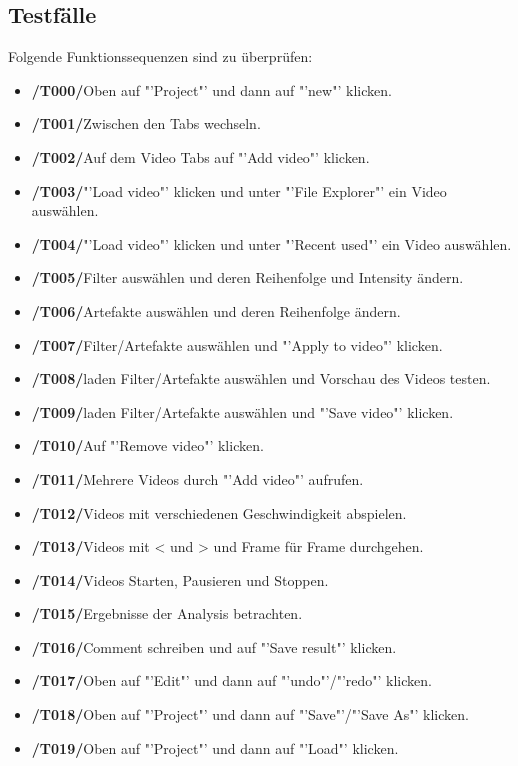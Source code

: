 \documentclass[parskip=full]{scrartcl}
\begin{document}
\subsection{Testfälle}
Folgende Funktionssequenzen sind zu überprüfen:
\begin{itemize}
\item[]\textbf{/T000/}\qquad Oben auf "'Project"' und dann auf "'new"' klicken.
\item[]\textbf{/T001/}\qquad Zwischen den Tabs wechseln.
\item[]\textbf{/T002/}\qquad Auf dem Video Tabs auf "'Add video"' klicken.
\item[]\textbf{/T003/}\qquad "'Load video"' klicken und unter "'File Explorer"' ein Video auswählen.
\item[]\textbf{/T004/}\qquad "'Load video"' klicken und unter "'Recent used"' ein Video auswählen.
\item[]\textbf{/T005/}\qquad Filter auswählen und deren Reihenfolge und Intensity ändern.
\item[]\textbf{/T006/}\qquad Artefakte auswählen und deren Reihenfolge  ändern.
\item[]\textbf{/T007/}\qquad Filter/Artefakte auswählen und "'Apply to video"' klicken.
\item[]\textbf{/T008/}\qquad laden Filter/Artefakte auswählen und Vorschau des Videos testen.
\item[]\textbf{/T009/}\qquad laden Filter/Artefakte auswählen und "'Save video"' klicken.
\item[]\textbf{/T010/}\qquad Auf "'Remove video"' klicken.
\item[]\textbf{/T011/}\qquad Mehrere Videos durch "'Add video"' aufrufen.
\item[]\textbf{/T012/}\qquad Videos mit verschiedenen Geschwindigkeit abspielen.
\item[]\textbf{/T013/}\qquad Videos mit < und > und Frame für Frame  durchgehen.
\item[]\textbf{/T014/}\qquad Videos Starten, Pausieren und Stoppen.
\item[]\textbf{/T015/}\qquad Ergebnisse der Analysis betrachten.
\item[]\textbf{/T016/}\qquad Comment schreiben und auf "'Save result"' klicken.
\item[]\textbf{/T017/}\qquad Oben auf "'Edit"' und dann auf "'undo"'/"'redo"' klicken.
\item[]\textbf{/T018/}\qquad Oben auf "'Project"' und dann auf "'Save"'/"'Save As"' klicken.
\item[]\textbf{/T019/}\qquad Oben auf "'Project"' und dann auf "'Load"' klicken.
\end{itemize}
\end{document}

